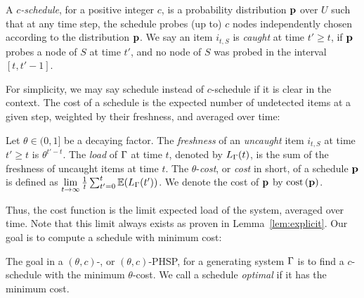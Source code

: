 \begin{definition}[Schedule]
A \emph{$c$-schedule}, for a positive integer $c$, is a probability distribution $\mathbf{p}$ over $U$ such that at any time step, the schedule probes (up to) $c$ nodes independently chosen according to the distribution $\mathbf{p}$. We say an item $i_{t,S}$ is \emph{caught} at time $t'\geq t$, if $\mathbf{p}$ probes a node of $S$ at time $t'$, and no node of $S$ was probed in the interval $[t,t'-1]$.
\end{definition}
For simplicity, we may say schedule instead of $c$-schedule if it is clear in the context. 
The cost of a schedule is the expected number of undetected items at a given step, weighted by their freshness, and averaged over time:
\begin{definition}
Let $\theta\in(0,1]$ be a decaying factor. The \emph{freshness} of an \emph{uncaught} item $i_{t,S}$ at time $t'\geq t$ is $\theta^{t'-t}$. The \emph{load} of $\Gamma$ at time $t$, denoted by $L_\Gamma(t)$, is the sum of the freshness of uncaught items at time $t$. The $\theta$-\emph{cost}, or \emph{cost} in short, of a schedule $\mathbf{p}$ is defined as 
$\lim\limits_{t\rightarrow\infty}\frac{1}{t}\sum_{t'=0}^{t}\mathbb{E}(L_\Gamma(t'))$. 
We denote the cost of $\mathbf{p}$ by $\text{cost}\left( \mathbf{p} \right)$.
\end{definition} 
Thus, the cost function is the limit expected load of the system, averaged over time. Note that this limit always exists as proven in Lemma~\ref{lem:explicit}. 
Our goal is to compute a schedule with minimum cost:
\begin{definition}[\probname]
 The goal in a $(\theta,c)$-{\probname}, or $(\theta,c)$-PHSP, for a generating system $\Gamma$ is to find  a $c$-schedule with the minimum $\theta$-cost. We call a schedule \emph{optimal} if it has the minimum cost.
\end{definition}

